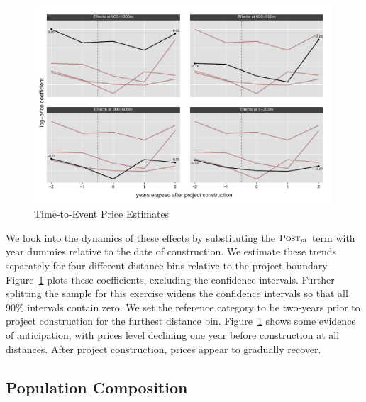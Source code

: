 \documentclass[12pt]{article}
\begin{document}
\begin{figure}[t!]
\caption{Time-to-Event Price Estimates}\label{figure:timeplot}
\centering
\includegraphics[width=0.99\textwidth,trim={0cm 0cm 0cm 0cm},clip=true]{figures/DDDplot_pertime_alt_unspaghetti}
\vspace{-2mm}
\end{figure}

We look into the dynamics of these effects by substituting the $\textsc{\small Post}_{pt}$ term with year dummies relative to the date of construction. We estimate these trends separately for four different distance bins relative to the project boundary.  Figure~\ref{figure:timeplot} plots these coefficients, excluding the confidence intervals.  Further splitting the sample for this exercise widens the confidence intervals so that all 90\% intervals contain zero.  We set the reference category to be two-years prior to project construction for the furthest distance bin. Figure~\ref{figure:timeplot} shows some evidence of anticipation, with prices level declining one year before construction at all distances. After project construction, prices appear to gradually recover. %


\subsection{Population Composition}
\end{document}
